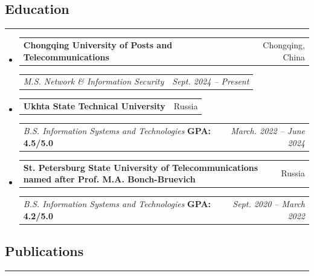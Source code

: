 \documentclass[11pt,letterpaper]{article}
\makeatletter
\newcommand{\headerrow}[2]
{\begin{tabular*}{\linewidth}{l@{\extracolsep{\fill}}r}
#1 & #2 \\
\end{tabular*}}
\makeatother
\begin{document}
\vspace{0.2cm}

\subsection*{\Large Education}
\vspace{-0.5em}
\hrule
\vspace{0.3em}

\begin{itemize}[leftmargin=0em, itemsep=0.4em]
    \parskip=0.1em

    \item
    \headerrow
        {\textbf{Chongqing University of Posts and Telecommunications}}
        {Chongqing, China}
    \headerrow
        {\emph{M.S. Network \& Information Security}}
        {\emph{Sept. 2024 -- Present}}

    \item
    \headerrow
        {\textbf{Ukhta State Technical University}}
        {Russia}
    \headerrow
        {\emph{B.S. Information Systems and Technologies} \quad \textbf{GPA: 4.5/5.0}}
        {\emph{March. 2022 -- June 2024}}

    \item
    \headerrow
        {\textbf{St. Petersburg State University of Telecommunications named after Prof. M.A. Bonch-Bruevich}}
        {Russia}
    \headerrow
        {\emph{B.S. Information Systems and Technologies} \quad \textbf{GPA: 4.2/5.0}}
        {\emph{Sept. 2020 -- March 2022}}

\end{itemize}

\vspace{0.2cm}

\subsection*{\Large Publications}
\vspace{-0.5em}
\hrule
\vspace{0.3em}
\end{document}
